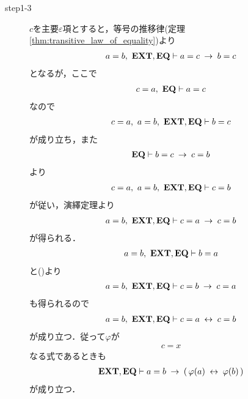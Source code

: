 \begin{sketch}
\begin{description}
			\item[step1-3]
				$c$を主要$\varepsilon$項とすると，等号の推移律(定理\ref{thm:transitive_law_of_equality})より
				\begin{align}
					a = b,\ \mbox{{\bf EXT}},\mbox{{\bf EQ}} \vdash a = c \hspace{0.25em}\rightarrow\hspace{0.25em} b = c
				\end{align}
				となるが，ここで
				\begin{align}
					c = a,\ \mbox{{\bf EQ}} \vdash a = c
				\end{align}
				なので
				\begin{align}
					c = a,\ a = b,\ \mbox{{\bf EXT}},\mbox{{\bf EQ}} \vdash b = c
				\end{align}
				が成り立ち，また
				\begin{align}
					\mbox{{\bf EQ}} \vdash b = c \hspace{0.25em}\rightarrow\hspace{0.25em} c = b
				\end{align}
				より
				\begin{align}
					c = a,\ a = b,\ \mbox{{\bf EXT}},\mbox{{\bf EQ}} \vdash c = b
				\end{align}
				が従い，演繹定理より
				\begin{align}
					a = b,\ \mbox{{\bf EXT}},\mbox{{\bf EQ}} \vdash c = a \hspace{0.25em}\rightarrow\hspace{0.25em} c = b
					\label{fom:the_principle_of_substitution_1}
				\end{align}
				が得られる．
				\begin{align}
					a = b,\ \mbox{{\bf EXT}},\mbox{{\bf EQ}} \vdash b = a
				\end{align}
				と()より
				\begin{align}
					a = b,\ \mbox{{\bf EXT}},\mbox{{\bf EQ}} \vdash c = b \hspace{0.25em}\rightarrow\hspace{0.25em} c = a
				\end{align}
				も得られるので
				\begin{align}
					a = b,\ \mbox{{\bf EXT}},\mbox{{\bf EQ}} \vdash c = a \hspace{0.25em}\leftrightarrow\hspace{0.25em} c = b
				\end{align}
				が成り立つ．従って$\varphi$が
				\begin{align}
					c = x
				\end{align}
				なる式であるときも
				\begin{align}
					\mbox{{\bf EXT}},\mbox{{\bf EQ}} \vdash a = b \hspace{0.25em}\rightarrow\hspace{0.25em} (\, \varphi(a) \hspace{0.25em}\leftrightarrow\hspace{0.25em} \varphi(b)\, )
				\end{align}
				が成り立つ．
			

\end{description}
\end{sketch}
